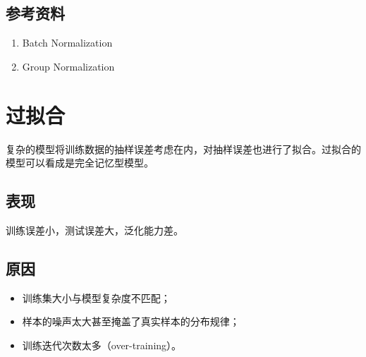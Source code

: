 \documentclass[letterpaper,10pt,english]{sphinxmanual}
\begin{document}
\subsection{参考资料}
\label{\detokenize{deepLearning/03_batchnorm:id3}}\begin{enumerate}
\item {} 
Batch Normalization

\end{enumerate}
\begin{quote}

\end{quote}
\begin{enumerate}
\setcounter{enumi}{1}
\item {} 
Group Normalization

\end{enumerate}
\begin{quote}

\end{quote}


\section{过拟合}
\label{\detokenize{deepLearning/04_overfit::doc}}\label{\detokenize{deepLearning/04_overfit:id1}}
复杂的模型将训练数据的抽样误差考虑在内，对抽样误差也进行了拟合。过拟合的模型可以看成是完全记忆型模型。


\subsection{表现}
\label{\detokenize{deepLearning/04_overfit:id2}}
训练误差小，测试误差大，泛化能力差。


\subsection{原因}
\label{\detokenize{deepLearning/04_overfit:id3}}\begin{itemize}
\item {} 
训练集大小与模型复杂度不匹配；

\item {} 
样本的噪声太大甚至掩盖了真实样本的分布规律；

\item {} 
训练迭代次数太多（over-training）。

\end{itemize}
\end{document}
